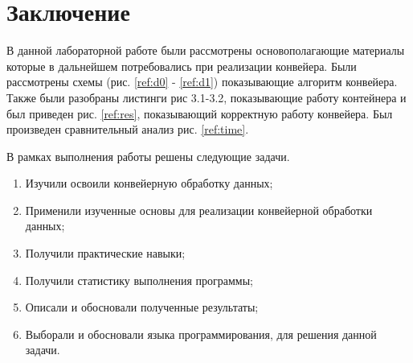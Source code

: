\chapter*{Заключение}

В данной лабораторной работе были рассмотрены
основополагающие материалы которые в дальнейшем потребовались
при реализации конвейера.
Были рассмотрены схемы (рис. \ref{ref:d0} - \ref{ref:d1}) показывающие алгоритм конвейера.
Также были разобраны листинги рис 3.1-3.2,
показывающие работу контейнера и был приведен рис. \ref{ref:res},
показывающий корректную работу конвейера.
Был произведен сравнительный анализ рис. \ref{ref:time}.

В рамках выполнения работы решены следующие задачи.

\begin{enumerate}
	\item Изучили освоили конвейерную обработку данных;
	\item Применили изученные основы для реализации конвейерной обработки данных;
	\item Получили практические навыки;
	\item Получили статистику выполнения программы;
	\item Описали и обосновали полученные результаты;
	\item Выборали и обосновали языка программирования, для решения данной задачи.
\end{enumerate}
